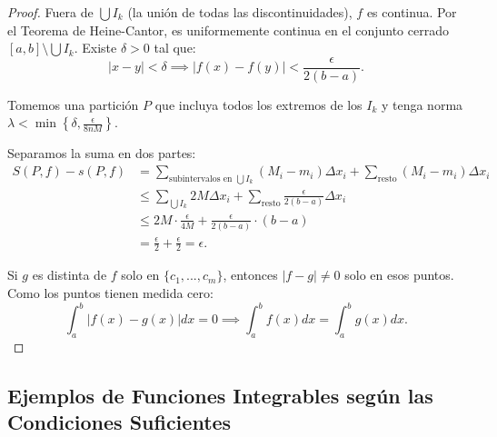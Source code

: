\documentclass{article}
\begin{document}
\begin{enumerate}
\begin{itemize}
\begin{proof}
                Fuera de \( \bigcup I_k \) (la unión de todas las discontinuidades), \( f \) es continua. Por el Teorema de Heine-Cantor, es uniformemente continua en el conjunto cerrado \( [a,b] \setminus \bigcup I_k \). Existe \( \delta > 0 \) tal que:
                \[
                |x - y| < \delta \implies |f(x) - f(y)| < \frac{\epsilon}{2(b - a)}.
                \]

                Tomemos una partición \( P \) que incluya todos los extremos de los \( I_k \) y tenga norma \( \lambda < \min\left\{\delta, \frac{\epsilon}{8nM}\right\} \).

                Separamos la suma en dos partes:
                \begin{align*}
                    S(P,f) - s(P,f) &= \sum_{\text{subintervalos en } \bigcup I_k} (M_i - m_i)\Delta x_i + \sum_{\text{resto}} (M_i - m_i)\Delta x_i \\
                    &\leq \sum_{\bigcup I_k} 2M \Delta x_i + \sum_{\text{resto}} \frac{\epsilon}{2(b - a)} \Delta x_i \\
                    &\leq 2M \cdot \frac{\epsilon}{4M} + \frac{\epsilon}{2(b - a)} \cdot (b - a) \\
                    &= \frac{\epsilon}{2} + \frac{\epsilon}{2} = \epsilon.
                \end{align*}

                Si \( g \) es distinta de \( f \) solo en \( \{c_1, ..., c_m\} \), entonces \( |f - g| \neq 0 \) solo en esos puntos. Como los puntos tienen medida cero:
                \[
                \int_a^b |f(x) - g(x)| dx = 0 \implies \int_a^b f(x) dx = \int_a^b g(x) dx.
                \]
            \end{proof}

    \end{itemize}
\end{enumerate}

\subsection*{Ejemplos de Funciones Integrables según las Condiciones Suficientes}
\end{document}

